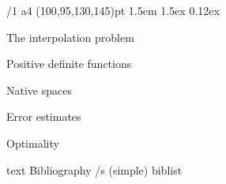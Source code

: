 \useOpTeX  %


\hyperlinks \Black \Black
{}

\enlang
\fontfam[EBGaramond]

\def\QED{\Umathchar"0"01"00203B}

\margins/1 a4 (100,95,130,145)pt
\typosize[12.21/14.5]
\parindent 1.5em
\parskip 1.5ex
 0.12ex




\sec The interpolation problem


\sec Positive definite functions


\sec Native spaces


\sec Error estimates


\sec Optimality










\let\_mtext\ignoreit
\nonum\chap Bibliography
\def\_opwarning#1{}
\usebib/s (simple) biblist


\bye